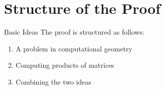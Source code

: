 \section{Structure of the Proof}

\begin{frame}{Basic Ideas}
    The proof is structured as follows:
    \begin{enumerate}
        \item<1-> A problem in computational geometry
        \item<2-> Computing products of matrices
        \item<3-> Combining the two ideas
    \end{enumerate}
\end{frame}

